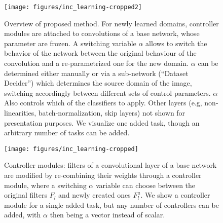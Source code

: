 \documentclass[10pt,journal,compsoc]{IEEEtran}
\begin{document}
%
\IEEEpeerreviewmaketitle




\begin{figure*}
\texttt{[image: figures/inc\_learning-cropped2]}

\caption{\label{fig:Summary-of-proposed} Overview of proposed method. For
newly learned domains, controller modules are attached to convolutions
of a base network, whose parameter are frozen. A switching variable
$\alpha$ allows to switch the behavior of the network between the
original behaviour of the convolution and a re-parametrized one for
the new domain. $\alpha$ can be determined either manually or via
a sub-network (``Dataset Decider'') which determines the source
domain of the image, switching accordingly between different sets
of control parameters. $\alpha$ Also controls which of the classifiers
to apply. Other layers (e.g, non-linearities, batch-normalization,
skip layers) not shown for presentation purposes. We visualize one
added task, though an arbitrary number of tasks can be added.}
\end{figure*}

\begin{figure}
\begin{centering}
\texttt{[image: figures/inc\_learning-cropped]}
\par\end{centering}
\caption{\label{fig:Controller-modules}Controller modules: filters of a convolutional
layer of a base network are modified by re-combining their weights
through a controller module, where a switching $\alpha$ variable
can choose between the original filters $F_{l}$ and newly created
ones $F_{l}^{a}$. We show a controller module for a single added
task, but any number of controllers can be added, with $\alpha$ then
being a vector instead of scalar. }

\end{figure}
\end{document}
